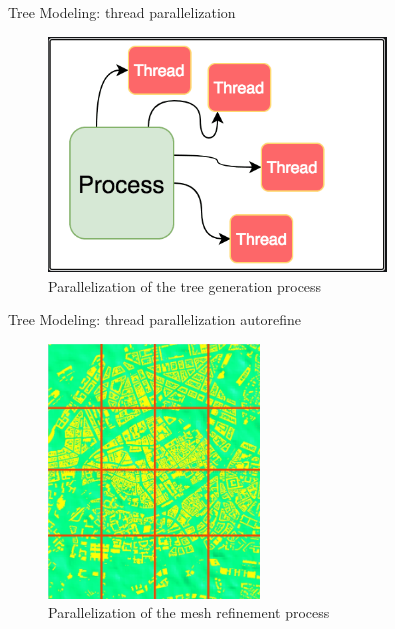 \documentclass[10pt]{beamer}
\begin{document}
\begin{frame}{Tree Modeling: thread parallelization}
	\begin{figure}
		\centering
		\includegraphics[width=0.8\textwidth]{images/thread_parallelization.PNG}
		\caption{Parallelization of the tree generation process}
		\label{fig:figure1}
	\end{figure}
\end{frame}

\begin{frame}{Tree Modeling: thread parallelization autorefine}
	\begin{figure}
		\centering
		\includegraphics[width=0.5\textwidth]{images/stras_cutted.png}
		\caption{Parallelization of the mesh refinement process}
		\label{fig:figure1}
	\end{figure}
\end{frame}
\end{document}
